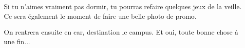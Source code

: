 Si tu n'aimes vraiment pas dormir, tu pourras refaire quelques jeux de la veille. Ce sera également le moment de faire une belle photo de promo.

On rentrera ensuite en car, destination le campus. Et oui, toute bonne chose à une fin...

